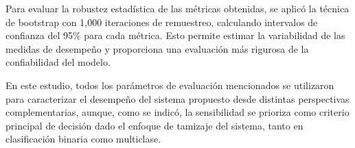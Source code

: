 Para evaluar la robustez estadística de las métricas obtenidas, se aplicó la técnica de
bootstrap con 1,000 iteraciones de remuestreo, calculando intervalos de confianza del
95\% para cada métrica. Esto permite estimar la variabilidad de las medidas de desempeño
y proporciona una evaluación más rigurosa de la confiabilidad del modelo.

En este estudio, todos los parámetros de evaluación mencionados se utilizaron para
caracterizar el desempeño del sistema propuesto desde distintas perspectivas
complementarias, aunque, como se indicó, la sensibilidad se prioriza como criterio
principal de decisión dado el enfoque de tamizaje del sistema, tanto en clasificación
binaria como multiclase.
